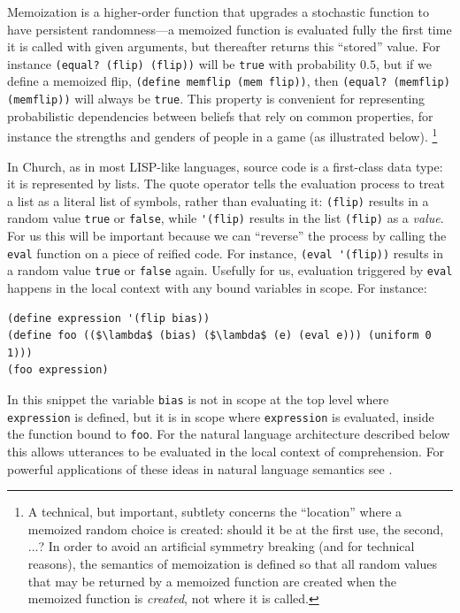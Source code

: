 \documentclass[pdfextras]{handbook}
\begin{document}
Memoization is a higher-order function that upgrades a stochastic function to have persistent randomness---a memoized function is evaluated fully the first time it is called with given arguments, but thereafter returns this ``stored'' value. For instance \lstinline{(equal? (flip) (flip))} will be \lstinline{true} with probability $0.5$, but if we define a memoized flip, \lstinline{(define memflip (mem flip))}, then \lstinline{(equal? (memflip) (memflip))} will always be \lstinline{true}. This property is convenient for representing probabilistic dependencies between beliefs that rely on common properties, for instance the strengths and genders of people in a game (as illustrated below).
\footnote{A technical, but important, subtlety concerns the ``location'' where a memoized random choice is created: should it be at the first use, the second, ...? 
In order to avoid an artificial symmetry breaking (and for technical reasons), the semantics of memoization is defined so that all random values that may be returned by a memoized function are created when the memoized function is \emph{created}, not where it is called.}

\label{eval}
In Church, as in most LISP-like languages, source code is a first-class data type: it is represented by lists. The quote operator tells the evaluation process to treat a list as a literal list of symbols, rather than evaluating it: \lstinline{(flip)} results in a random value \lstinline{true} or \lstinline{false}, while \lstinline{'(flip)} results in the list \lstinline{(flip)} as a \emph{value}.
 For us this will be important because we can ``reverse'' the process by calling the \lstinline{eval} function on a piece of reified code. For instance, \lstinline{(eval '(flip))} results in a random value \lstinline{true} or \lstinline{false} again. Usefully for us, evaluation triggered by \lstinline{eval} happens in the local context with any bound variables in scope. For instance:
\begin{lstlisting}[mathescape]
(define expression '(flip bias))
(define foo (($\lambda$ (bias) ($\lambda$ (e) (eval e))) (uniform 0 1)))
(foo expression)
\end{lstlisting}
In this snippet the variable \lstinline{bias} is not in scope at the top level where \lstinline{expression} is defined, but it is in scope where \lstinline{expression} is evaluated, inside the function bound to \lstinline{foo}. For the natural language architecture described below this allows utterances to be evaluated in the local context of comprehension. For powerful applications of these ideas in natural language semantics see \cite{shan2010character}.
\end{document}
